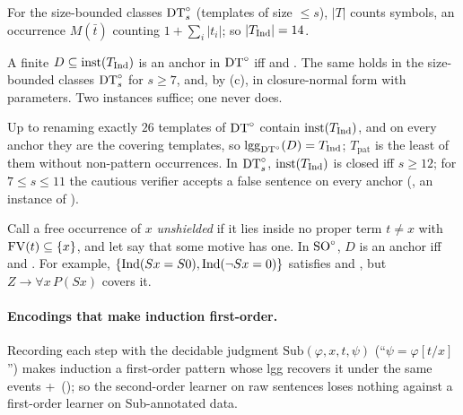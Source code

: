 For the size-bounded classes $\mathrm{DT}^{\circ}_s$ (templates of size $\le s$), $|T|$ counts symbols, an occurrence $M(\bar t)$
counting $1+\sum_i|t_i|$; so $|T_{\mathrm{Ind}}|=14$.

\begin{theorem}\label{thm:zf:indanchor}
A finite $D\subseteq\mathrm{inst}(T_{\mathrm{Ind}})$ is an anchor in $\mathrm{DT}^{\circ}$ iff \evR{} and \evN. The same holds in the size-bounded
classes $\mathrm{DT}^{\circ}_s$ for $s\ge7$, and, by (c), in closure-normal form with parameters. Two
instances suffice; one never does.
\end{theorem}
Up to renaming exactly $26$ templates of $\mathrm{DT}^{\circ}$ contain $\mathrm{inst}(T_{\mathrm{Ind}})$, and on every anchor they are the covering
templates, so $\mathrm{lgg}_{\mathrm{DT}^{\circ}}(D)=T_{\mathrm{Ind}}$; $T_{\mathrm{pat}}$ is the least of them without non-pattern occurrences. In
$\mathrm{DT}^{\circ}_s$, $\mathrm{inst}(T_{\mathrm{Ind}})$ is closed iff $s\ge12$; for $7\le s\le11$ the cautious verifier accepts a false sentence on
every anchor (, an instance of ).

\begin{proposition}\label{prop:zf:indso}
Call a free occurrence of $x$ \emph{unshielded} if it lies inside no proper term $t\ne x$ with
$\mathrm{FV}(t)\subseteq\{x\}$, and let \zfB{} say that some motive has one. In $\mathrm{SO}^{\circ}$, $D$ is an anchor iff \evR{} and \zfB.
For example, $\{\mathrm{Ind}(Sx=S0),\mathrm{Ind}(\neg Sx=0)\}$ satisfies \evR{} and \evN, but $Z\to\forall x\,P(Sx)$ covers it.
\end{proposition}

\paragraph{Encodings that make induction first-order.}
Recording each step with the decidable judgment $\mathrm{Sub}(\varphi,x,t,\psi)$ (``$\psi=\varphi[t/x]$'') makes
induction a first-order pattern whose lgg recovers it under the same events \evR+\evN\ (); so the
second-order learner on raw sentences loses nothing against a first-order learner on Sub-annotated data.

